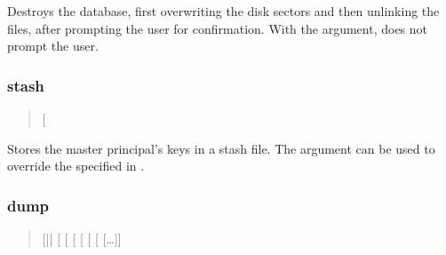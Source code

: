 \documentclass[letterpaper,10pt,english]{sphinxmanual}
\begin{document}
\sphinxAtStartPar
Destroys the database, first overwriting the disk sectors and then
unlinking the files, after prompting the user for confirmation.  With
the  argument, does not prompt the user.


\subsubsection{stash}
\label{\detokenize{admin/admin_commands/kdb5_util:stash}}\label{\detokenize{admin/admin_commands/kdb5_util:kdb5-util-destroy-end}}\label{\detokenize{admin/admin_commands/kdb5_util:kdb5-util-stash}}\begin{quote}

\sphinxAtStartPar
{} {[} \sphinxstyleemphasis{keyfile}{]}
\end{quote}

\sphinxAtStartPar
Stores the master principal’s keys in a stash file.  The 
argument can be used to override the  specified in
{\hyperref[\detokenize{admin/conf_files/kdc_conf:kdc-conf-5}]{}}.


\subsubsection{dump}
\label{\detokenize{admin/admin_commands/kdb5_util:dump}}\label{\detokenize{admin/admin_commands/kdb5_util:kdb5-util-stash-end}}\label{\detokenize{admin/admin_commands/kdb5_util:kdb5-util-dump}}\begin{quote}

\sphinxAtStartPar
{} {[}||\sphinxstylestrong{\sphinxhyphen{}r18}{]}
{[}\sphinxstylestrong{\sphinxhyphen{}verbose}{]} {[}\sphinxstylestrong{\sphinxhyphen{}mkey\_convert}{]} {[}
\sphinxstyleemphasis{mkey\_file}{]} {[}\sphinxstylestrong{\sphinxhyphen{}rev}{]} {[}\sphinxstylestrong{\sphinxhyphen{}recurse}{]} {[}
{[}…{]}{]}
\end{quote}
\end{document}
